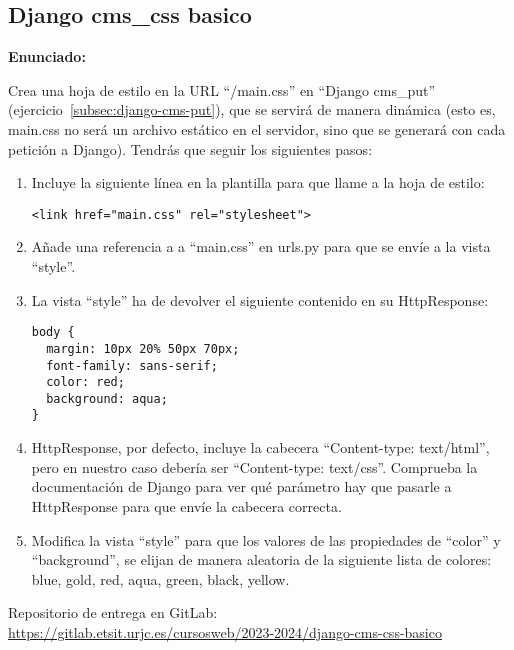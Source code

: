 \subsection{Django cms\_css basico}
\label{subsec:django-cms-css-basico}

\textbf{Enunciado:}

Crea una hoja de estilo en la URL ``/main.css'' en ``Django cms\_put'' (ejercicio~\ref{subsec:django-cms-put}), que se servirá de manera dinámica (esto es, main.css no será un archivo estático en el servidor, sino que se generará con cada petición a Django). Tendrás que seguir los siguientes pasos:

\begin{enumerate}

\item Incluye la siguiente línea en la plantilla para que llame a la hoja de estilo: 

\begin{verbatim}
<link href="main.css" rel="stylesheet">
\end{verbatim}

\item Añade una referencia a a ``main.css'' en urls.py para que se envíe a la vista ``style''.

\item La vista ``style'' ha de devolver el siguiente contenido en su HttpResponse:

\begin{verbatim}
body {
  margin: 10px 20% 50px 70px;
  font-family: sans-serif;
  color: red;
  background: aqua;
}
\end{verbatim}

\item HttpResponse, por defecto, incluye la cabecera ``Content-type: text/html'', pero en nuestro caso debería ser ``Content-type: text/css''. Comprueba la documentación de Django para ver qué parámetro hay que pasarle a HttpResponse para que envíe la cabecera correcta.

\item Modifica la vista ``style'' para que los valores de las propiedades de ``color'' y ``background'', se elijan de manera aleatoria de la siguiente lista de colores: blue, gold, red, aqua, green, black, yellow.
\end{enumerate}

Repositorio de entrega en GitLab: \\
\url{https://gitlab.etsit.urjc.es/cursosweb/2023-2024/django-cms-css-basico}

